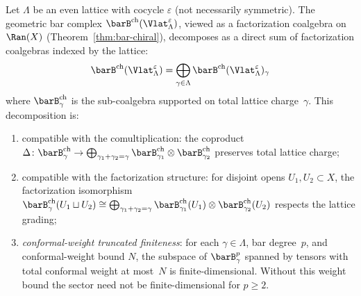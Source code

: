 \begin{proposition}
\label{prop:lattice:factorization-decomposition}
Let $\Lambda$ be an even lattice with cocycle $\varepsilon$
\textup{(}not necessarily symmetric\textup{)}. The geometric bar
complex $\barB^{\mathrm{ch}}(\Vlat_\Lambda^\varepsilon)$, viewed as
a factorization coalgebra on~$\Ran(X)$
\textup{(}Theorem~\textup{\ref{thm:bar-chiral})}, decomposes as a
direct sum of factorization coalgebras indexed by the lattice:
\begin{equation}\label{eq:lattice:fact-decomposition}
\barB^{\mathrm{ch}}(\Vlat_\Lambda^\varepsilon)
= \bigoplus_{\gamma \in \Lambda}
 \barB^{\mathrm{ch}}(\Vlat_\Lambda^\varepsilon)_\gamma
\end{equation}
where $\barB^{\mathrm{ch}}_\gamma$ is the sub-coalgebra supported on
total lattice charge~$\gamma$. This decomposition is:
\begin{enumerate}[label=(\roman*)]
\item compatible with the comultiplication: the coproduct
 $\Delta\colon \barB^{\mathrm{ch}}_\gamma \to
 \bigoplus_{\gamma_1+\gamma_2=\gamma}
 \barB^{\mathrm{ch}}_{\gamma_1} \otimes
 \barB^{\mathrm{ch}}_{\gamma_2}$
 preserves total lattice charge;
\item compatible with the factorization structure: for disjoint opens
 $U_1, U_2 \subset X$, the factorization isomorphism
 $\barB^{\mathrm{ch}}_\gamma(U_1 \sqcup U_2) \cong
 \bigoplus_{\gamma_1+\gamma_2=\gamma}
 \barB^{\mathrm{ch}}_{\gamma_1}(U_1)
 \otimes \barB^{\mathrm{ch}}_{\gamma_2}(U_2)$
 respects the lattice grading;
\item \emph{conformal-weight truncated finiteness}: for each
 $\gamma \in \Lambda$, bar degree~$p$, and conformal-weight bound
 $N$, the subspace of $\barB^p_\gamma$ spanned by tensors with total
 conformal weight at most~$N$ is finite-dimensional. Without this
 weight bound the sector need not be finite-dimensional for $p\geq2$.
\end{enumerate}
\end{proposition}

